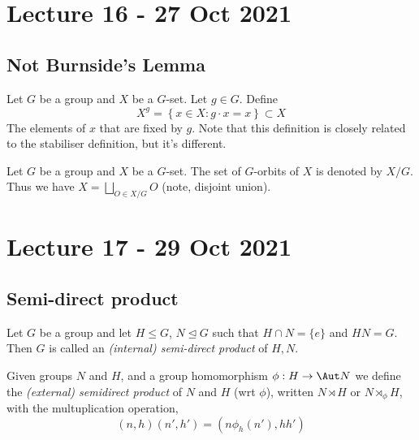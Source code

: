 \documentclass[11pt]{scrartcl}
\begin{document}
\section{Lecture 16 - 27 Oct 2021}

\subsection{Not Burnside's Lemma}

\begin{definition}
  Let $G$ be a group and $X$ be a $G$-set. Let $g\in G$. Define
  \[X^g=\left\{ x\in X : g\cdot x =x \right\} \subset X\]
  The elements of $x$ that are fixed by $g$. Note that this definition is closely related
  to the stabiliser definition, but it's different.
\end{definition}

\begin{definition}
  Let $G$ be a group and $X$ be a $G$-set. The set of $G$-orbits of $X$ is denoted by
  $X/G$. Thus we have $X=\bigsqcup_{O\in X/G} O$ (note, disjoint union).
\end{definition}

\section{Lecture 17 - 29 Oct 2021}

\subsection{Semi-direct product}

\begin{definition}
  Let $G$ be a group and let $H\leq G$, $N\trianglelefteq G$ such that $H\cap N = \{e\}$
  and $HN=G$. Then $G$ is called an \emph{(internal) semi-direct product} of $H,N$.
  \label{def:intSemidirProd}
\end{definition}

\begin{definition}
  Given groups $N$ and $H$, and a group homomorphism $\phi:H\to \Aut N$ we define the
  \emph{(external) semidirect product} of $N$ and $H$ (wrt $\phi$), written $N\rtimes H$
  or $N\rtimes_{\phi} H$, with the multuplication operation,
  \[(n,h)(n',h')=(n\phi_h(n'), hh')\]
  \label{def:exSemidirProd}
\end{definition}
\end{document}

